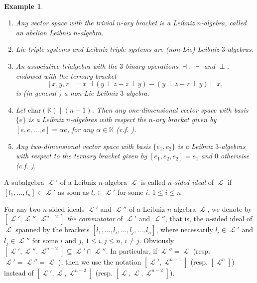 \documentclass[12pt, reqno]{amsart}
\newtheorem{example}[definition]{Example}
\def\ele{\operatorname{\mathcal{L}}}
\begin{document}
\


\begin{example} \
\begin{enumerate}
\item[i)] Any vector space with the trivial $n$-ary bracket is a Leibniz $n$-algebra, called an abelian Leibniz $n$-algebra.
\item[ ii)] Lie triple systems \cite{Li} and Leibniz triple systems \cite{BSO} are (non-Lie) Leibniz $3$-algebras.

\item[ iii)] An associative trialgebra \cite{LR} with the $3$ binary operations $\dashv$, $\vdash$  and $ \perp$, endowed with the ternary bracket
\[
[x,y,z] = x \dashv (y \perp z -z \perp y) - (y \perp z -z \perp
y) \vdash x,
\]
is (in general ) a non-Lie Leibniz $3$-algebra.
\item[ iv)]  Let $\text{char}(\mathbb{K})\mid (n-1)$. Then any one-dimensional vector space with basis $\{ e\}$ is a Leibniz $n$-algebras with respect the $n$-ary bracket given by $[e,e, \dots, e]= \alpha  e$, for any $\alpha \in \mathbb{K}$ (c.f. \cite[Example 2.1 (iv)]{CCGLO}).
\item[v)] Any two-dimensional vector space with
basis $\{e_1, e_2\}$ is a Leibniz $3$-algebras with respect to the ternary bracket given by  $[e_1,e_2,e_2]=e_1$ and $0$ otherwise (c.f. \cite[Theorem 2.14]{CCGLO}).

\end{enumerate}
\end{example}



A subalgebra ${\ele}'$ of a Leibniz $n$-algebra ${\ele}$ is called {\it $n$-sided ideal} of ${\ele}$ if $[l_1, \dots, l_n]
\in {\ele}'$  as soon as $l_i \in {\ele}'$ for some $i$, $1\leq i\leq n$.

For any two $n$-sided ideals ${\ele}'$ and ${\ele}''$  of a Leibniz $n$-algebra ${\ele}$, we denote by $[{\ele}', {\ele}'', {\ele}^{n-2}]$ {\it the commutator} of
${\ele}'$ and ${\ele}''$, that is, the $n$-sided ideal of ${\ele}$ spanned by the brackets $[l_1,\dots,l_i, \dots, l_j,\dots,l_n]$, where necessarily $l_i \in {\ele}'$ and $l_j\in {\ele}''$ for some $i$ and $j$, $1\leq i, j\leq n$, $i\neq j$. Obviously $[{\ele}', {\ele}'', {\ele}^{n-2}] \subseteq {\ele}' \cap {\ele}''$. In particular, if ${\ele}''={\ele}$ (resp. ${\ele}'={\ele}''={\ele}$ ), then we use the notation $[{\ele}', {\ele}^{n-1}]$ (resp. $[{\ele}^n]$) instead of $[{\ele}', {\ele}, {\ele}^{n-2}]$ (resp. $[{\ele}, {\ele}, {\ele}^{n-2}]$).
\end{document}
